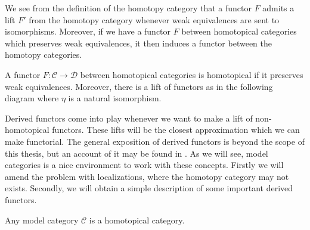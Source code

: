 \documentclass[../thesis.tex]{subfiles}
\begin{document}
            We see from the definition of the homotopy category that a functor $F$ admits a lift $F'$ from the homotopy category whenever weak equivalences are sent to isomorphisms. Moreover, if we have a functor $F$ between homotopical categories which preserves weak equivalences, it then induces a functor between the homotopy categories.
            
            \begin{definition}
                A functor $F:\mathcal{C}\rightarrow \mathcal{D}$ between homotopical categories is homotopical if it preserves weak equivalences. Moreover, there is a lift of functors as in the following diagram where $\eta$ is a natural isomorphism.

                \begin{center}
                \end{center}
            \end{definition}

            Derived functors come into play whenever we want to make a lift of non-homotopical functors. These lifts will be the closest approximation which we can make functorial. The general exposition of derived functors is beyond the scope of this thesis, but an account of it may be found in \cite{Riehl16}. As we will see, model categories is a nice environment to work with these concepts. Firstly we will amend the problem with localizations, where the homotopy category may not exists. Secondly, we will obtain a simple description of some important derived functors.

            \begin{proposition}
                Any model category $\mathcal{C}$ is a homotopical category.
            \end{proposition}
\end{document}
